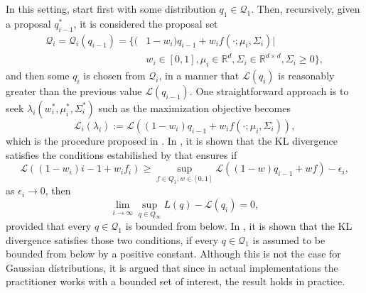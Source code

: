 In this setting, start first with some distribution $q_1 \in \mathcal{Q}_1$. Then, recursively, given a proposal $q_{i-1}^*$,  it is considered the proposal set
\begin{equation}
\begin{split}
\mathcal{Q}_{i} = \mathcal{Q}_{i}(q_{i-1}) = \{ (& 1-w_{i}) q_{i-1} + w_{i}  f(\cdot;\mu_{i},\Sigma_{i}) | \\  & w_i \in [0,1], \mu_i \in \mathbb{R}^d, \Sigma_i \in \mathbb{R}^{d \times d}, \Sigma_i \geq 0\},
\end{split}
\end{equation}
and then some $q_i$ is chosen from $\mathcal{Q}_i$, in a manner that $\mathcal{L}(q_i)$ is reasonably greater than the previous value $\mathcal{L}(q_{i-1})$. One straightforward approach is to seek $\lambda_i (w_{i}^*,\mu_{i}^*,\Sigma_{i}^*)$ such as the maximization objective becomes
\begin{equation}\label{miller_objective}
 \mathcal{L}_{i}(\lambda_{i}) := \mathcal{L}((1-w_{i}) q_{i-1} + w_{i}  f(\cdot;\mu_{i},\Sigma_{i})),
\end{equation}
which is the procedure proposed in \cite{Miller_2016}. In \cite{Guo_2016}, it is shown that the KL divergence satisfies the conditions estabilished by \cite{Tong_Zhang_2003} that ensures if
\begin{equation}
 \mathcal{L}((1-w_i){i-1} + w_i f_i) \geq \sup_{f \in Q_1,w\in[0,1]} \mathcal{L}((1-w)q_{i-1} + w f) - \epsilon_i,
\end{equation}
as $\epsilon_i \to 0$, then
\begin{equation}
 \lim_{i \to \infty} \sup_{q \in Q_\infty} L(q) - \mathcal{L}(q_i) = 0,
\end{equation}
provided that every $q \in \mathcal{Q}_1$ is bounded from below. In \cite{Guo_2016}, it is shown that the KL divergence satisfies those two conditions, if every $q \in \mathcal{Q}_1$ is assumed to be bounded from below by a positive constant. Although this is not the case for Gaussian distributions, it is argued that since in actual implementations the practitioner works with a bounded set of interest, the result holds in practice.


